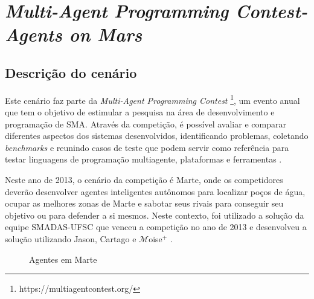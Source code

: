 \section{\textit{Multi-Agent Programming Contest- Agents on Mars}}

\subsection{Descrição do cenário}

Este cenário faz parte da \textit{Multi-Agent Programming Contest} \footnote[1]{https://multiagentcontest.org/}, um evento anual que tem o objetivo de estimular a pesquisa na área de desenvolvimento e programação de SMA. Através da competição, é possível avaliar e comparar diferentes aspectos dos sistemas desenvolvidos, identificando problemas, coletando \textit{benchmarks} e reunindo casos de teste que podem servir como referência para testar linguagens de programação multiagente, plataformas e ferramentas \cite{koster2012multi, ahlbrecht2013multi}.

Neste ano de 2013, o cenário da competição é Marte, onde os competidores deverão desenvolver agentes inteligentes autônomos para localizar poços de água, ocupar
as melhores zonas de Marte e sabotar seus rivais para conseguir seu objetivo ou para defender a si mesmos. Neste contexto, foi utilizado a solução da equipe SMADAS-UFSC que venceu a competição no ano de 2013 e desenvolveu a solução utilizando Jason, Cartago e $\mathcal{M}$oise$^{+}$ \cite{zatelli2013smadas, ahlbrecht2013multi}.

\begin{figure}[ht]
  \centering
  \caption{Agentes em Marte}
  \label{fig:marte}
\end{figure}



